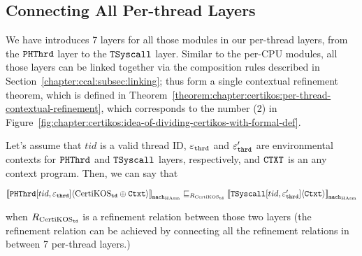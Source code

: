 \subsection{Connecting All Per-thread Layers}
\label{chapter:certikos:subsec:connecting-all-thread-layers}

We have introduces 7 layers for all those modules in our per-thread layers, from the ${\mathrm{\texttt{PHThrd}}}$ layer to the 
${\mathrm{\texttt{TSyscall}}}$ layer.
Similar to the per-CPU modules, all those layers can be linked together via the composition rules described in Section~\ref{chapter:ccal:subsec:linking};
thus form a single contextual refinement theorem, which is defined in Theorem~\ref{theorem:chapter:certikos:per-thread-contextual-refinement},
which corresponds to the number (2) in Figure~\ref{fig:chapter:certikos:idea-of-dividing-certikos-with-formal-def}.
\begin{theorem}
\label{theorem:chapter:certikos:per-thread-contextual-refinement}
Let's assume that $tid$ is a valid thread ID, ${\varepsilon}_{{\mathrm{\texttt{thrd}}}}$ and  ${\varepsilon}'_{{\mathrm{\texttt{thrd}}}}$ are environmental contexts for 
${\mathrm{\texttt{PHThrd}}}$  and ${\mathrm{\texttt{TSyscall}}}$ layers, respectively, and ${\mathrm{\texttt{CTXT}}}$ is an any context program. Then, we can say that
\begin{center}
${[\![{{\mathrm{\texttt{PHThrd}}}[tid, {\varepsilon}_{{\mathrm{\texttt{thrd}}}}]} \langle {\mathrm{CertiKOS}_{{\mathrm{\texttt{td}}}} \oplus {\mathrm{\texttt{Ctxt}}}} \rangle]\!]}_{{\mathrm{\texttt{mach}}}_{\mathrm{HAsm}}} \sqsubseteq_{R_{\mathrm{CertiKOS}_{\mathrm{\texttt{td}}}}} {[\![{{\mathrm{\texttt{TSyscall}}}[tid, {\varepsilon}'_{{\mathrm{\texttt{thrd}}}}]} \langle {{\mathrm{\texttt{Ctxt}}}} \rangle]\!]}_{{{\mathrm{\texttt{mach}}}_{\mathrm{HAsm}}}}$
\end{center}
when ${R_{\mathrm{CertiKOS}_{\mathrm{\texttt{td}}}}}$ is a refinement relation between those two layers (the refinement relation can be achieved by 
connecting all the refinement relations in between 7 per-thread layers.)
\end{theorem}


